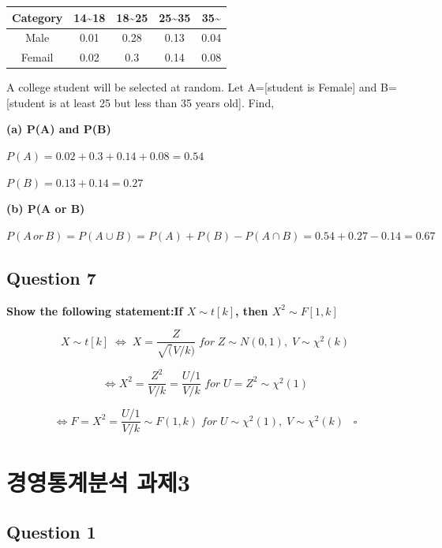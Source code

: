 \documentclass[
  a4paper,
  DIV=11,
  numbers=noendperiod]{scrreprt}
\begin{document}
\begin{longtable}[]{@{}ccccc@{}}
\toprule\noalign{}
Category & 14\textasciitilde18 & 18\textasciitilde25 &
25\textasciitilde35 & 35\textasciitilde{} \\
\midrule\noalign{}
\endhead
\bottomrule\noalign{}
\endlastfoot
Male & 0.01 & 0.28 & 0.13 & 0.04 \\
Femail & 0.02 & 0.3 & 0.14 & 0.08 \\
\end{longtable}

A college student will be selected at random. Let A={[}student is
Female{]} and B={[}student is at least 25 but less than 35 years old{]}.
Find,

\textbf{(a) P(A) and P(B)}

\(P(A)=0.02+0.3+0.14+0.08=0.54\)

\(P(B)=0.13+0.14=0.27\)

\textbf{(b) P(A or B)}

\(P(A\,or\,B)=P(A\cup B)=P(A)+P(B)-P(A\cap B)=0.54+0.27-0.14=0.67\)

\section*{Question 7}\label{question-7}


\textbf{Show the following statement:If \(X\sim t[k]\), then
\(X^2\sim F[1,k]\)}

\[X\sim t[k]\;\Leftrightarrow\;X=\frac{Z}{\sqrt(V/k)}\;for\;Z\sim N(0,1),\;V\sim \chi^2(k)\]

\[\Leftrightarrow X^2=\frac{Z^2}{V/k}=\frac{U/1}{V/k}\;for\;U=Z^2\sim \chi^2(1)\]

\[\Leftrightarrow F=X^2=\frac{U/1}{V/k}\sim F(1,k)\;for\;U\sim\chi^2(1),\;V\sim\chi^2(k)\;\;\;\square\]

\chapter*{경영통계분석
과제3}\label{uxacbduxc601uxd1b5uxacc4uxbd84uxc11d-uxacfcuxc81c3}


\section*{Question 1}\label{question-1-2}
\end{document}
